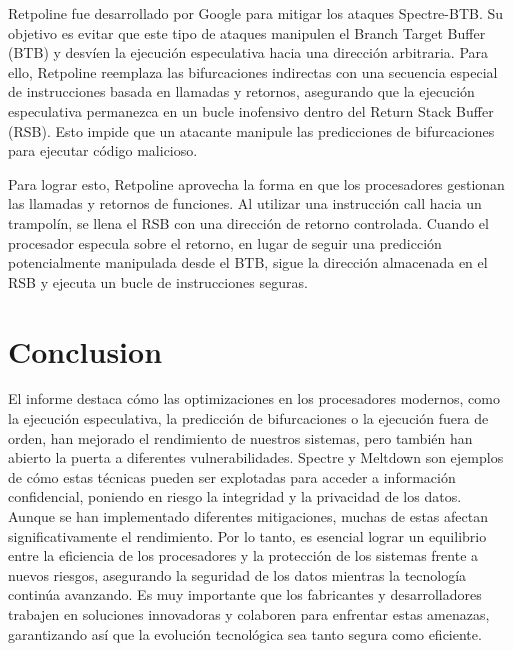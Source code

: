 \documentclass[lettersize,compsoc]{IEEEtran}
\begin{document}
Retpoline fue desarrollado por Google para mitigar los ataques Spectre-BTB. Su objetivo es evitar que este tipo de ataques manipulen el Branch Target Buffer (BTB) y desvíen la ejecución especulativa hacia una dirección arbitraria. Para ello, Retpoline reemplaza las bifurcaciones indirectas con una secuencia especial de instrucciones basada en llamadas y retornos, asegurando que la ejecución especulativa permanezca en un bucle inofensivo dentro del Return Stack Buffer (RSB). Esto impide que un atacante manipule las predicciones de bifurcaciones para ejecutar código malicioso.

Para lograr esto, Retpoline aprovecha la forma en que los procesadores gestionan las llamadas y retornos de funciones. Al utilizar una instrucción call hacia un trampolín, se llena el RSB con una dirección de retorno controlada. Cuando el procesador especula sobre el retorno, en lugar de seguir una predicción potencialmente manipulada desde el BTB, sigue la dirección almacenada en el RSB y ejecuta un bucle de instrucciones seguras.\cite{retpoline1}\cite{retpoline2}

\section{Conclusion}
El informe destaca cómo las optimizaciones en los procesadores modernos, como la ejecución especulativa, la predicción de bifurcaciones o la ejecución fuera de orden, han mejorado el rendimiento de nuestros sistemas, pero también han abierto la puerta a diferentes vulnerabilidades. Spectre y Meltdown son ejemplos de cómo estas técnicas pueden ser explotadas para acceder a información confidencial, poniendo en riesgo la integridad y la privacidad de los datos. Aunque se han implementado diferentes mitigaciones, muchas de estas afectan significativamente el rendimiento. Por lo tanto, es esencial lograr un equilibrio entre la eficiencia de los procesadores y la protección de los sistemas frente a nuevos riesgos, asegurando la seguridad de los datos mientras la tecnología continúa avanzando. Es muy importante que los fabricantes y desarrolladores trabajen en soluciones innovadoras y colaboren para enfrentar estas amenazas, garantizando así que la evolución tecnológica sea tanto segura como eficiente.
\end{document}

